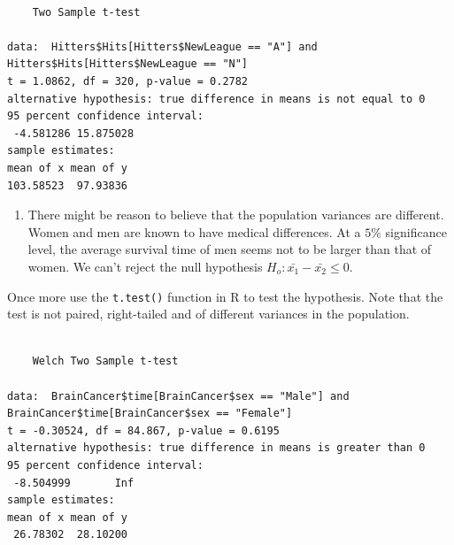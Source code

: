\documentclass[
  letterpaper,
  DIV=11,
  numbers=noendperiod]{scrreprt}
\newenvironment{Shaded}{\begin{snugshade}}{\end{snugshade}}
\newcommand{\AttributeTok}[1]{\textcolor[rgb]{0.40,0.45,0.13}{#1}}
\newcommand{\DecValTok}[1]{\textcolor[rgb]{0.68,0.00,0.00}{#1}}
\newcommand{\FloatTok}[1]{\textcolor[rgb]{0.68,0.00,0.00}{#1}}
\newcommand{\FunctionTok}[1]{\textcolor[rgb]{0.28,0.35,0.67}{#1}}
\newcommand{\NormalTok}[1]{\textcolor[rgb]{0.00,0.23,0.31}{#1}}
\newcommand{\SpecialCharTok}[1]{\textcolor[rgb]{0.37,0.37,0.37}{#1}}
\newcommand{\StringTok}[1]{\textcolor[rgb]{0.13,0.47,0.30}{#1}}
\providecommand{\tightlist}{%
  \setlength{\itemsep}{0pt}\setlength{\parskip}{0pt}}\usepackage{longtable,booktabs,array}
\begin{document}
\begin{verbatim}

    Two Sample t-test

data:  Hitters$Hits[Hitters$NewLeague == "A"] and Hitters$Hits[Hitters$NewLeague == "N"]
t = 1.0862, df = 320, p-value = 0.2782
alternative hypothesis: true difference in means is not equal to 0
95 percent confidence interval:
 -4.581286 15.875028
sample estimates:
mean of x mean of y 
103.58523  97.93836 
\end{verbatim}

\begin{enumerate}
\def\labelenumi{\arabic{enumi}.}
\setcounter{enumi}{1}
\tightlist
\item
  There might be reason to believe that the population variances are
  different. Women and men are known to have medical differences. At a
  \(5\)\% significance level, the average survival time of men seems not
  to be larger than that of women. We can't reject the null hypothesis
  \(H_{o}:\bar {x_{1}}-\bar {x_{2}} \leq 0\).
\end{enumerate}

Once more use the \texttt{t.test()} function in R to test the
hypothesis. Note that the test is not paired, right-tailed and of
different variances in the population.

\begin{Shaded}
\end{Shaded}

\begin{verbatim}

    Welch Two Sample t-test

data:  BrainCancer$time[BrainCancer$sex == "Male"] and BrainCancer$time[BrainCancer$sex == "Female"]
t = -0.30524, df = 84.867, p-value = 0.6195
alternative hypothesis: true difference in means is greater than 0
95 percent confidence interval:
 -8.504999       Inf
sample estimates:
mean of x mean of y 
 26.78302  28.10200 
\end{verbatim}
\end{document}
